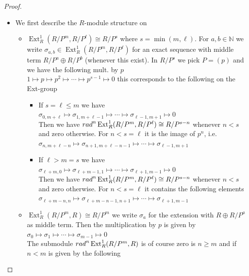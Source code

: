 \documentclass[10pt,a4paper]{amsart}
\DeclareMathOperator{\Ext}{Ext}
\begin{document}
\begin{proof}
\begin{itemize}
\item[(1)] We first describe the $R$-module structure on 
\begin{itemize}
    \item[(a)] $\Ext^1_R (R/P^m, R/P^{\ell})\cong R/P^s$ where $s=\min (m, \ell)$. For $a,b\in \mathbb{N}$ we write $\sigma_{a,b}\in \Ext^1_R(R/P^m, R/P^{\ell})$ for an exact sequence with middle term $R/P^a\oplus R/P^b$ (whenever this exist). In $R/P^s$ we pick $P=(p)$ and we have the following mult. by $p$ \\
    $1 \mapsto p \mapsto p^2 \mapsto \cdots \mapsto p^{s-1} \mapsto 0$
    this corresponds to the following on the Ext-group
    \begin{itemize}
     \item[(a1)] If $s=\ell \leq m$ we have \\
      $\sigma_{0, m+\ell}\mapsto \sigma_{1, m+\ell-1} \mapsto\cdots \mapsto  \sigma_{\ell-1, m+1}  \mapsto 0$\\
     Then we have ${\rm rad}^n\Ext^1_R(R/P^m, R/P^{\ell})\cong R/P^{s-n}$ whenever $n<s$ and zero otherwise. For $n<s=\ell$ it is the image of $p^n$, i.e.   \\
      $\sigma_{n, m+\ell-n}\mapsto \sigma_{n+1, m+\ell-n-1} \mapsto\cdots \mapsto  \sigma_{\ell-1, m+1} $
     \item[(a2)] If $\ell >m=s$ we have \\
     $\sigma_{\ell +m, 0}\mapsto \sigma_{\ell+m-1, 1} \mapsto\cdots \mapsto  \sigma_{\ell+1,m-1} \mapsto 0$\\
     Then we have ${\rm rad}^n\Ext^1_R(R/P^m, R/P^{\ell})\cong R/P^{s-n}$ whenever $n<s$ and zero otherwise. For $n<s=\ell$ it contains the following elements  \\
      $\sigma_{\ell+m-n, n}\mapsto \sigma_{\ell +m-n-1,n+1} \mapsto\cdots \mapsto  \sigma_{\ell+1, m-1} $
    \end{itemize}
    \item[(b) ] $\Ext^1_R(R/P^m, R)\cong R/P^m$ we write $\sigma_a$ for the extension with $R \oplus R/P^a$ as middle term. Then the multiplication by $p$ is given by \\
    $\sigma_{0} \mapsto \sigma_{1} \mapsto \cdots \mapsto \sigma_{m-1} \mapsto 0$\\
    The submodule ${\rm rad}^n\Ext^1_R(R/P^m, R)$ is of course zero is $n\geq m$ and if $n<m$ is given by the following \\

\end{itemize}
\end{itemize}
\end{proof}
\end{document}
